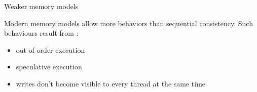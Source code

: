 \documentclass[dvipsnames,svgnames,beamer, 12pt]{beamer}
\begin{document}
\begin{frame}{Weaker memory models}

	\vfill
	Modern memory models allow more behaviors than sequential consistency.
	\vfill
	Such behaviours result from :\begin{itemize}
	\item out of order execution
	\item speculative execution
	\item writes don't become visible to every thread at the same time
	\end{itemize}
	\vfill

\end{frame}

\iffalse
\begin{frame}{Restoring ordering}

	Fences : instructions that ensure events before the fence occur before those after the fence.
	\vfill
	Data dependencies : when an instruction A uses the value of an instruction B for some calculation.
	\vfill
	In such a situation processors will ensure B occurs before A.

\end{frame}

\begin{frame}[fragile]{litmus tests}

	\vfill
	\vfill
	A litmus test is a short parallel program and an assertion about the result.
	\begin{figure}
	\centering
	\begin{tabular}{p{4cm} p{4cm}}
	\begin{verbatim}
	Thread 0
	x = 1;
	y = 1;
	\end{verbatim} &
	\begin{verbatim}
	Thread 1
	while(y = 0) {}
	r1 = x;
	\end{verbatim}
	\end{tabular}
	\centerline{Always $r1 = 1$}
	\caption{The message passing litmus test}
	\end{figure}
	\vfill
	We use them to find out about the possible behaviours of machines.
	\vfill
	\vfill

\end{frame}\fi
\end{document}
